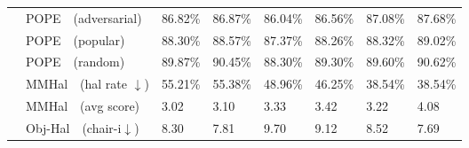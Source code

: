 \begin{table}[t!]
{\begin{tabular}{p{1.5cm}p{3cm}p{1.5cm}p{1.6cm}p{1.5cm}p{1.6cm}p{1.5cm}p{1.6cm}}
     & POPE~\cite{pope}~\tiny{(adversarial)} \newline \tiny{\color{light-gray}{Object Hallucination.}} & 86.82\tiny{\%} & \cellcolor{front-color} 86.87\tiny{\%} \tiny{\color{brown}{+0.05\%}} & 86.04\tiny{\%} & \cellcolor{front-color} 86.56\tiny{\%} \tiny{\color{brown}{+0.52\%}} & 87.08\tiny{\%} & \cellcolor{front-color}87.68\tiny{\%} \tiny{\color{brown}{+0.60\%}}  \\
     & POPE~\cite{pope}~\tiny{(popular)} \newline \tiny{\color{light-gray}{Object Hallucination.}} & 88.30\tiny{\%} & \cellcolor{front-color} 88.57\tiny{\%} \tiny{\color{brown}{+0.27\%}} & 87.37\tiny{\%} & \cellcolor{front-color} 88.26\tiny{\%} \tiny{\color{brown}{+0.89\%}} & 88.32\tiny{\%} & \cellcolor{front-color}89.02\tiny{\%} \tiny{\color{brown}{+0.70\%}}  \\
     & POPE~\cite{pope}~\tiny{(random)} \newline \tiny{\color{light-gray}{Object Hallucination.}} & 89.87\tiny{\%} & \cellcolor{front-color} 90.45\tiny{\%} \tiny{\color{brown}{+0.58\%}} & 88.30\tiny{\%} & \cellcolor{front-color} 89.30\tiny{\%} \tiny{\color{brown}{+1.00\%}} & 89.60\tiny{\%} & \cellcolor{front-color}90.62\tiny{\%} \tiny{\color{brown}{+1.02\%}}  \\
    & MMHal~\cite{mmhal-bench}~\tiny{(hal rate $\downarrow$)} \newline \tiny{\color{light-gray}{General Hallucination}} & 55.21\tiny{\%} & \cellcolor{front-color} 55.38\tiny{\%} \tiny{\color{gray}{-0.17\%}} & 48.96\tiny{\%} & \cellcolor{front-color} 46.25\tiny{\%} \tiny{\color{brown}{+2.71\%}} & 38.54\tiny{\%} & \cellcolor{front-color}38.54\tiny{\%} \tiny{\color{brown}{+0.00\%}}  \\
     & MMHal~\cite{mmhal-bench}~\tiny{(avg score)} \newline \tiny{\color{light-gray}{General Hallucination}} & 3.02 & \cellcolor{front-color} 3.10 \tiny{\color{brown}{+0.08}} & 3.33 & \cellcolor{front-color} 3.42 \tiny{\color{brown}{+0.09}} & 3.22 & \cellcolor{front-color}4.08 \tiny{\color{brown}{+0.86}}  \\
     & Obj-Hal~\cite{li2023evaluating}~\tiny{(chair-i$\downarrow$)} \newline \tiny{\color{light-gray}{Object Hallucination.}} & 8.30 & \cellcolor{front-color}  7.81 \tiny{\color{brown}{+0.49}} & 9.70 & \cellcolor{front-color} 9.12 \tiny{\color{brown}{+0.58}} & 8.52 & \cellcolor{front-color}7.69 \tiny{\color{brown}{+0.83}}  \\

\end{tabular}}
\end{table}
